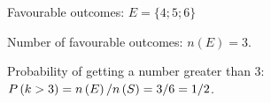         \par 
        \label{m39377*id112007}Favourable outcomes: \begin{math}E=\{4;5;6\}\end{math}\par 
        \label{m39377*id112039}Number of favourable outcomes: \begin{math}n\left(E\right)=3\end{math}.\par 
        \label{m39377*id112045}Probability of getting a number greater than 3:
\begin{math}P\left(k>{}3\right)=n\left(E\right)/n\left(S\right)=3/6=1/2\end{math}.\par 
\label{m39377*secfhsst!!!underscore!!!id319}\vspace{.5cm} 
      
